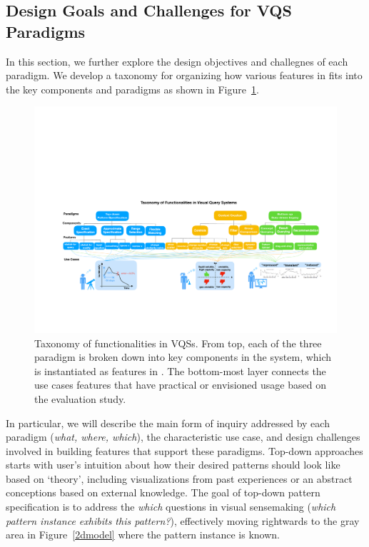 \subsection{Design Goals and Challenges for VQS Paradigms}
In this section, we further explore the design objectives and challegnes of each paradigm. We develop a taxonomy for organizing how various features in \zv fits into the key components and paradigms as shown in Figure~\ref{fig:taxonomy}.
\begin{figure}[ht!]
  \centering
  \includegraphics[width=\linewidth]{figures/full_taxonomy.pdf}
  \caption{Taxonomy of functionalities in VQSs. From top, each of the three paradigm is broken down into key components in the system, which is instantiated as features in \zv. The bottom-most layer connects the use cases features that have practical or envisioned usage based on the evaluation study.}
  \label{fig:taxonomy}
\end{figure}
In particular, we will describe the main form of inquiry addressed by each paradigm (\textit{what, where, which}), the characteristic use case, and design challenges involved in building features that support these paradigms.
 Top-down approaches starts with user's intuition about how their desired patterns should look like based on `theory', including visualizations from past experiences or an abstract conceptions based on external knowledge. The goal of top-down pattern specification is to address the \textit{which} questions in visual sensemaking (\textit{which pattern instance exhibits this pattern?}), effectively moving rightwards to the gray area in Figure~\ref{2dmodel} where the pattern instance is known. 
